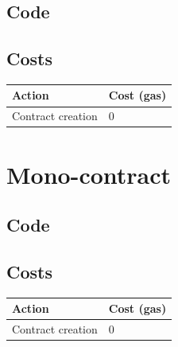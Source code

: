 \documentclass{article}
\begin{document}
		\subsection{Code}
		\label{app:multi-contract-code}

			

		\subsection{Costs}

			\begin{tabular}{| l | l |}
				\hline
				Action & Cost (gas) \\ \hline
				Contract creation & 0 \\
				\hline
			\end{tabular}

	\section{Mono-contract}

		\subsection{Code}

			

		\subsection{Costs}

			\begin{tabular}{| l | l |}
				\hline
				Action & Cost (gas) \\ \hline
				Contract creation & 0 \\
				\hline
			\end{tabular}
\end{document}
